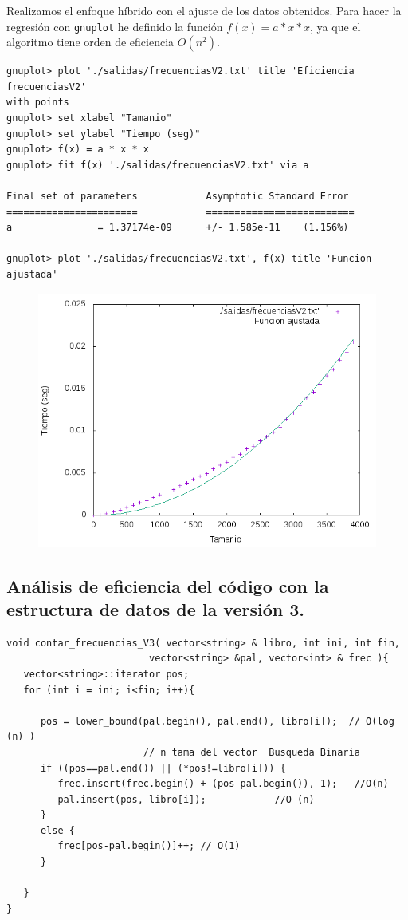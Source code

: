\documentclass[11pt]{article}
\begin{document}
Realizamos el enfoque híbrido con el ajuste de los datos obtenidos. Para hacer la regresión con \texttt{gnuplot} he definido la función $f(x) = a * x * x$, ya que el algoritmo tiene orden de eficiencia $O(n^2)$.

\begin{verbatim}
gnuplot> plot './salidas/frecuenciasV2.txt' title 'Eficiencia frecuenciasV2' 
with points
gnuplot> set xlabel "Tamanio"
gnuplot> set ylabel "Tiempo (seg)"
gnuplot> f(x) = a * x * x
gnuplot> fit f(x) './salidas/frecuenciasV2.txt' via a

Final set of parameters            Asymptotic Standard Error
=======================            ==========================
a               = 1.37174e-09      +/- 1.585e-11    (1.156%)

gnuplot> plot './salidas/frecuenciasV2.txt', f(x) title 'Funcion ajustada'
\end{verbatim}

\begin{figure}[H]
\begin{center}
\includegraphics[width=12cm]{../salidas/frecuenciasV2.png}
\end{center}
\end{figure}


\subsection{Análisis de eficiencia del código con la estructura de datos de la versión 3.}

\begin{verbatim}
void contar_frecuencias_V3( vector<string> & libro, int ini, int fin,
                         vector<string> &pal, vector<int> & frec ){
   vector<string>::iterator pos;
   for (int i = ini; i<fin; i++){

      pos = lower_bound(pal.begin(), pal.end(), libro[i]);  // O(log (n) )
      					// n tama del vector  Busqueda Binaria
      if ((pos==pal.end()) || (*pos!=libro[i])) {
         frec.insert(frec.begin() + (pos-pal.begin()), 1);   //O(n)
         pal.insert(pos, libro[i]);            //O (n)
      }
      else {
         frec[pos-pal.begin()]++; // O(1)
      }

   }
}
\end{verbatim}
\end{document}
